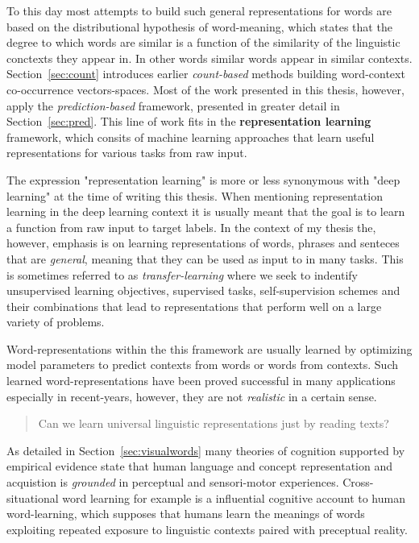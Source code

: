 To this day most attempts to build such general representations for words are based on the 
distributional hypothesis of word-meaning, which states that the degree to which words are similar 
is a function of the similarity of the linguistic conctexts they appear in. In other words similar 
words appear in similar contexts. Section~\ref{sec:count} introduces earlier \emph{count-based} 
methods building word-context co-occurrence vectors-spaces. 
Most of the work presented in this thesis, however, apply the \emph{prediction-based} framework,
presented in greater detail in Section~\ref{sec:pred}. 
This line of work fits in the \textbf{representation learning} framework, which consits of
machine learning approaches that learn useful representations for various tasks from raw input.

The expression "representation learning" is more or less synonymous with "deep learning" at the time
of writing this thesis. When mentioning representation learning in the deep learning context
it is usually meant that the goal is to learn a function from raw input to target labels. In the 
context of my thesis the, however, emphasis is on learning representations of words, phrases and 
senteces that are \emph{general}, meaning 
that they can be used as input to in many tasks. This is sometimes referred to as 
\emph{transfer-learning} where we seek to indentify unsupervised learning objectives, 
supervised tasks, self-supervision schemes and their combinations that lead to representations that
perform well on a large variety of problems. 

Word-representations within the this framework are usually learned by
optimizing model parameters to predict contexts from words or words from contexts.
Such learned word-representations have been proved successful in many applications especially 
in recent-years, however, they are not \emph{realistic} in a certain sense. 

\begin{quote}
Can we learn universal linguistic representations just by reading texts?
\end{quote}

As detailed in Section~\ref{sec:visualwords} many theories of cognition supported by empirical
evidence state that human language and concept representation and acquistion is \emph{grounded}
in perceptual and sensori-motor experiences. Cross-situational word learning for example is 
a influential cognitive account to human word-learning, which supposes that humans learn the
meanings of words exploiting repeated exposure to linguistic contexts paired with preceptual reality.

